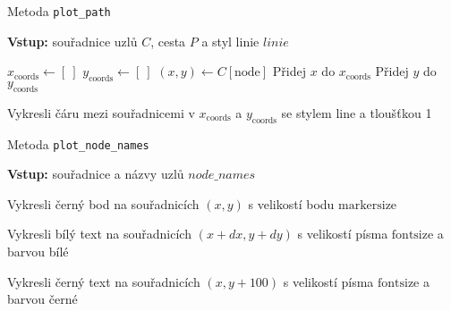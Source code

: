 \begin{algorithm}
    \caption{Metoda \texttt{plot\_path}}
    \begin{algorithmic}[1]
        \STATE \textbf{Vstup:} souřadnice uzlů $C$, cesta $P$ a styl linie $linie$
        
        \STATE $x_\text{coords} \gets [~]$
        \STATE $y_\text{coords} \gets [~]$ 
            \STATE $(x, y) \gets C[\text{node}]$
            \STATE Přidej $x$ do $x_\text{coords}$
            \STATE Přidej $y$ do $y_\text{coords}$
        \ENDFOR
        
        \STATE Vykresli čáru mezi souřadnicemi v $x_\text{coords}$ a $y_\text{coords}$ se stylem $\text{line}$ a tloušťkou 1
    \end{algorithmic}
\end{algorithm}

\begin{algorithm}
    \caption{Metoda \texttt{plot\_node\_names}}
    \begin{algorithmic}[1]
        \STATE \textbf{Vstup:} souřadnice a názvy uzlů $node\_names$
        
            \STATE Vykresli černý bod na souřadnicích $(x, y)$ s velikostí bodu $\text{markersize}$

                \STATE Vykresli bílý text na souřadnicích $(x + dx, y + dy)$ s velikostí písma $\text{fontsize}$ a barvou bílé
            \ENDFOR

            \STATE Vykresli černý text na souřadnicích $(x, y + 100)$ s velikostí písma $\text{fontsize}$ a barvou černé
        \ENDFOR
    \end{algorithmic}
\end{algorithm}

